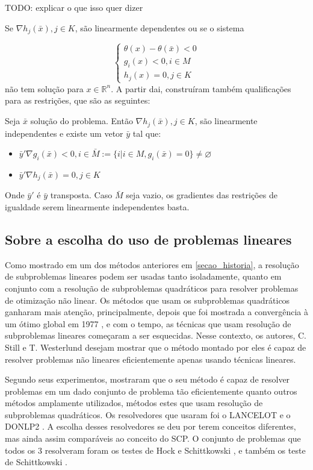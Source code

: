 TODO: explicar o que isso quer dizer

Se \( \nabla h_j(\bar x), j \in K\), são linearmente dependentes ou se o sistema

\begin{equation}
    \begin{cases}
      \theta(x) - \theta(\bar x) < 0\\
      g_i(x) < 0, i \in M\\
      h_j(x) = 0, j \in K
    \end{cases}
\end{equation}
não tem solução para \( x \in \mathbb{R}^n \). A partir dai, construíram também qualificações para
as restrições, que são as seguintes:

Seja \( \bar x \) solução do problema. Então \( \nabla h_j(\bar x), j \in K\),
são linearmente independentes e existe um vetor \(\bar y\) tal que:

\begin{itemize}
\item \( \bar y' \nabla g_i(\bar x) < 0, i \in \bar M := \{i | i \in M, g_i(\bar x) = 0 \} \neq \varnothing \)
\item \( \bar y' \nabla h_j(\bar x) = 0, j \in K \)
\end{itemize}

Onde \( \bar y' \) é \(\bar y\) transposta. Caso \(\bar M\) seja vazio, os gradientes das restrições
de igualdade serem linearmente independentes basta.




\subsection{Sobre a escolha do uso de problemas lineares}
Como mostrado em um dos métodos anteriores em \ref{secao_historia}, a resolução de subproblemas
lineares podem ser usadas tanto isoladamente, quanto em conjunto com a resolução de subproblemas
quadráticos para resolver problemas de otimização não linear. Os métodos que usam os subproblemas
quadráticos ganharam mais atenção, principalmente, depois que foi mostrada a convergência à um
ótimo global em 1977 \cite{han1977globally}, e com o tempo, as técnicas que usam resolução de
subproblemas lineares começaram a ser esquecidas. Nesse contexto, os autores, C. Still e
T. Westerlund desejam mostrar que o método montado por eles é capaz de resolver problemas não
lineares eficientemente apenas usando técnicas lineares.

Segundo seus experimentos, mostraram que o seu método é capaz de resolver problemas em um dado
conjunto de problema tão eficientemente quanto outros métodos amplamente utilizados, métodos
estes que usam resolução de subproblemas quadráticos. Os resolvedores que usaram foi o LANCELOT
\cite{conn1991globally} e o DONLP2 \cite{spellucci1999donlp2}. A escolha desses resolvedores se
deu por terem conceitos diferentes, mas ainda assim comparáveis ao conceito do SCP. O conjunto
de problemas que todos os 3 resolveram foram os testes de Hock e Schittkowski \cite{Hock1981}, e
também os teste de Schittkowski \cite{Schittkowski1987}.

